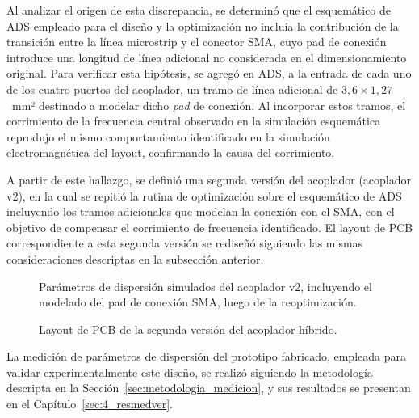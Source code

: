 Al analizar el origen de esta discrepancia, se determinó que el esquemático de ADS empleado para el diseño y la optimización no incluía la contribución de la transición entre la línea microstrip y el conector SMA, cuyo pad de conexión introduce una longitud de línea adicional no considerada en el dimensionamiento original. Para verificar esta hipótesis, se agregó en ADS, a la entrada de cada uno de los cuatro puertos del acoplador, un tramo de línea adicional de $3{,}6 \times 1{,}27$~mm² destinado a modelar dicho \textit{pad} de conexión. Al incorporar estos tramos, el corrimiento de la frecuencia central observado en la simulación esquemática reprodujo el mismo comportamiento identificado en la simulación electromagnética del layout, confirmando la causa del corrimiento.

A partir de este hallazgo, se definió una segunda versión del acoplador (acoplador v2), en la cual se repitió la rutina de optimización sobre el esquemático de ADS incluyendo los tramos adicionales que modelan la conexión con el SMA, con el objetivo de compensar el corrimiento de frecuencia identificado. El layout de PCB correspondiente a esta segunda versión se rediseñó siguiendo las mismas consideraciones descriptas en la subsección anterior.

\begin{figure}[H]
    \centering
    \caption{Parámetros de dispersión simulados del acoplador v2, incluyendo el modelado del pad de conexión SMA, luego de la reoptimización.}
    \label{fig:acoplador_resultados_ads_v2}
\end{figure}

\begin{figure}[H]
    \centering
    \caption{Layout de PCB de la segunda versión del acoplador híbrido.}
    \label{fig:acoplador_pcb_v2}
\end{figure}

La medición de parámetros de dispersión del prototipo fabricado, empleada para validar experimentalmente este diseño, se realizó siguiendo la metodología descripta en la Sección~\ref{sec:metodologia_medicion}, y sus resultados se presentan en el Capítulo~\ref{sec:4_resmedver}.